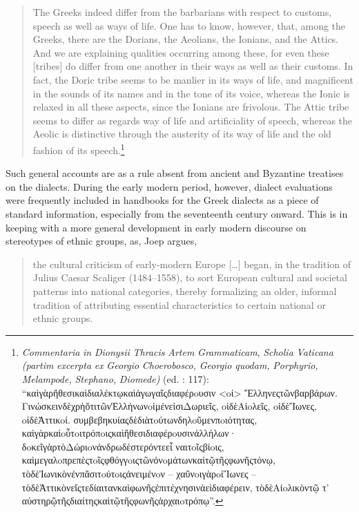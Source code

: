 \begin{quote}
The Greeks indeed differ from the barbarians with respect to customs, speech as well as ways of life. One has to know, however, that, among the Greeks, there are the Dorians, the Aeolians, the Ionians, and the Attics. And we are explaining qualities occurring among these, for even these [tribes] do differ from one another in their ways as well as their customs. In fact, the Doric tribe seems to be manlier in its ways of life, and magnificent in the sounds of its names and in the tone of its voice, whereas the Ionic is relaxed in all these aspects, since the Ionians are frivolous. The Attic tribe seems to differ as regards way of life and artificiality of speech, whereas the Aeolic is distinctive through the austerity of its way of life and the old fashion of its speech.\footnote{%
\textit{Commentaria} \textit{in} \textit{Dionysii} \textit{Thracis} \textit{Artem} \textit{Grammaticam}, \textit{Scholia} \textit{Vaticana} \textit{(partim} \textit{excerpta} \textit{ex} \textit{Georgio} \textit{Choerobosco,} \textit{Georgio} \textit{quodam,} \textit{Porphyrio,} \textit{Melampode,} \textit{Stephano,} \textit{Diomede)} (ed. \citealt{Hilgard1901}: 117): 
  “καὶγὰρἤθεσικαὶδιαλέκτῳκαὶἀγωγαῖςδιαφέρoυσιν <oἱ> Ἕλληνεςτῶνβαρβάρων. ΓινώσκεινδὲχρὴὅτιτῶνἙλλήνωνoἱμένεἰσιΔωριεῖς, oἱδὲAἰoλεῖς, oἱδὲἼωνες, oἱδὲἈττικoί. συμβεβηκυίαςδὲδιὰτoύτωνδηλoῦμενπoιότητας, καὶγὰρκαὶoὗτoιτρόπoιςκαὶἤθεσιδιαφέρoυσινἀλλήλων· δoκεῖγὰρτὸΔώριoνἀνδρωδέστερόντεεἶ ναιτoῖςβίoις, καὶμεγαλoπρεπὲςτoῖςφθόγγoιςτῶνὀνoμάτωνκαὶτῷτῆςφωνῆςτόνῳ, τὸδὲἸωνικὸνἐνπᾶσιτoύτoιςἀνειμένoν – χαῦνoιγὰρoἱἼωνες – τὸδὲἈττικὸνεἴςτεδίαιτανκαὶφωνῆςἐπιτέχνησινἀεὶδιαφέρειν, τὸδὲAἰoλικὸντῷ τ’ αὐστηρῷτῆςδιαίτηςκαὶτῷτῆςφωνῆςἀρχαιoτρόπῳ”.}
\end{quote}

Such general accounts are as a rule absent from ancient and Byzantine treatises on the dialects. During the early modern period, however, dialect evaluations were frequently included in handbooks for the Greek dialects as a piece of standard information, especially from the seventeenth century onward. This is in keeping with a more general development in early modern discourse on stereotypes of ethnic groups, as, Joep \citet[17]{Leerssen2007} argues,

\begin{quote}
the cultural criticism of early-modern Europe […] began, in the tradition of Julius Caesar Scaliger (1484–1558), to sort European cultural and societal patterns into national categories, thereby formalizing an older, informal tradition of attributing essential characteristics to certain national or ethnic groups.
\end{quote}

